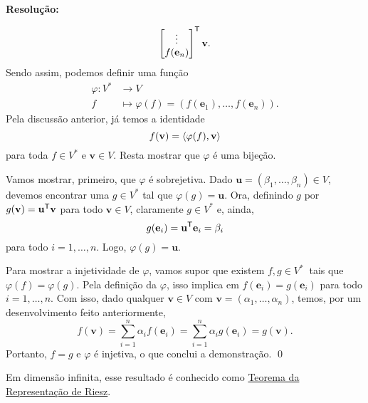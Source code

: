 \documentclass[leqno]{article}
\numberwithin{equation}{section}
\newcommand{\bfv}{\mathbf{v}}
\newcommand{\bfu}{\mathbf{u}}
\newcommand{\bfe}{\mathbf{e}}
\newenvironment{sol}
{
    \vspace{4mm}
    \noindent\textbf{Resolução:}
    \strut\newline
    \smallskip
    \hspace{-3.5mm}
}
{}
\begin{document}
\begin{enumerate}
\begin{enumerate}
\begin{sol}
\begin{equation*}
\begin{bmatrix}
                            \vdots \\
                            f ( \bfe_{ n } )
                        \end{bmatrix}^{ \transpose }
                        \bfv
                    .\end{equation*}
                    Sendo assim, podemos definir uma função
                    \begin{align*}
                        \varphi : V^{ * } &\to V \\
                        f &\mapsto \varphi ( f ) =
                        ( f ( \bfe_{ 1 } ), \dots, f ( \bfe_{ n } ) )
                    .\end{align*}
                    Pela discussão anterior, já temos a identidade
                    \begin{equation*}
                        f ( \bfv ) = \dotprod{\varphi ( f ), \bfv}
                    \end{equation*}
                    para toda \( f \in V^{ * } \) e \( \bfv \in V \).
                    Resta mostrar que \( \varphi \) é uma bijeção.

                    Vamos mostrar, primeiro, que \( \varphi \) é sobrejetiva.
                    Dado \( \bfu = ( \beta_{ 1 }, \dots, \beta_{ n } ) \in V\), devemos encontrar uma \( g \in V^{ * } \) tal que \( \varphi ( g ) = \bfu \).
                    Ora, definindo \( g \) por \( g ( \bfv ) = \bfu^{ \transpose } \bfv \) para todo \( \bfv \in V \), claramente \( g \in V^{ * } \) e, ainda,
                    \begin{equation*}
                        g ( \bfe_{ i } ) = \bfu^{ \transpose } \bfe_{ i } = \beta_{ i }
                    \end{equation*}
                    para todo \( i = 1, \dots, n \).
                    Logo, \( \varphi ( g ) = \bfu \).

                    Para mostrar a injetividade de \( \varphi \), vamos supor que existem \( f, g \in V^{ * } \ \) tais que \( \varphi ( f ) = \varphi ( g ) \).
                    Pela definição da \( \varphi \), isso implica em \( f ( \bfe_{ i } ) = g ( \bfe_{ i } ) \) para todo \( i = 1, \dots, n \).
                    Com isso, dado qualquer \( \bfv \in V \) com \( \bfv = ( \alpha_{ 1 }, \dots, \alpha_{ n } ) \), temos, por um desenvolvimento feito anteriormente,
                    \begin{equation*}
                        f ( \bfv )
                        = \sum_{ i=1 }^{ n } \alpha_{ i } f ( \bfe_{ i } )
                        = \sum_{ i=1 }^{ n } \alpha_{ i } g ( \bfe_{ i } )
                        = g ( \bfv )
                    .\end{equation*}
                    Portanto, \( f = g \) e \( \varphi \) é injetiva, o que conclui a demonstração. \hfill \qed
                \end{sol} 
        \end{enumerate}
        Em dimensão infinita, esse resultado é conhecido como \href{https://en.wikipedia.org/wiki/Riesz_representation_theorem}{Teorema da Representação de Riesz}.
\end{enumerate}
\end{document}
